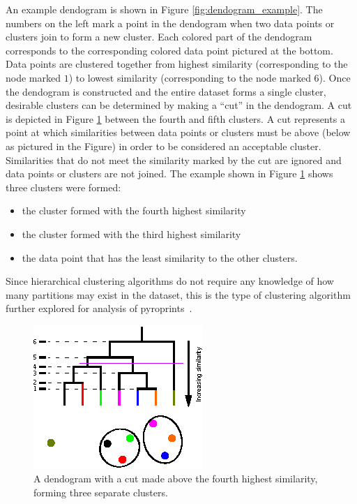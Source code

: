 \documentclass[12pt]{ucthesis}
\begin{document}
      An example dendogram is shown in Figure \ref{fig:dendogram_example}. The
      numbers on the left mark a point in the dendogram when two data points or
      clusters join to form a new cluster. Each colored part of the dendogram
      corresponds to the corresponding colored data point pictured at the
      bottom. Data points are clustered together from highest similarity
      (corresponding to the node marked $1$) to lowest similarity
      (corresponding to the node marked $6$). Once the dendogram is
      constructed and the entire dataset forms a single cluster, desirable
      clusters can be determined by making a ``cut'' in the dendogram. A cut is
      depicted in Figure \ref{fig:dendogram_example_with_cut} between the
      fourth and fifth clusters. A cut represents a point at which similarities
      between data points or clusters must be above (below as pictured in the
      Figure) in order to be considered an acceptable cluster. Similarities
      that do not meet the similarity marked by the cut are ignored and data
      points or clusters are not joined. The example shown in Figure
      \ref{fig:dendogram_example_with_cut} shows three clusters were formed:
      \begin{itemize}
         \item the cluster formed with the fourth highest similarity
         \item the cluster formed with the third highest similarity
         \item the data point that has the least similarity to the other
               clusters.
      \end{itemize}
      Since hierarchical clustering algorithms do not require any knowledge of
      how many partitions may exist in the dataset, this is the type of
      clustering algorithm further explored for analysis of
      pyroprints~\cite{Jain:DataClustering}.

      \begin{figure}[t]
         \centering
         \includegraphics[width=0.7\columnwidth]{graphics/DendogramExample_WithCut.eps}
         \caption{A dendogram with a cut made above the fourth highest
                  similarity, forming three separate clusters.}
         \label{fig:dendogram_example_with_cut}
      \end{figure}
\end{document}
